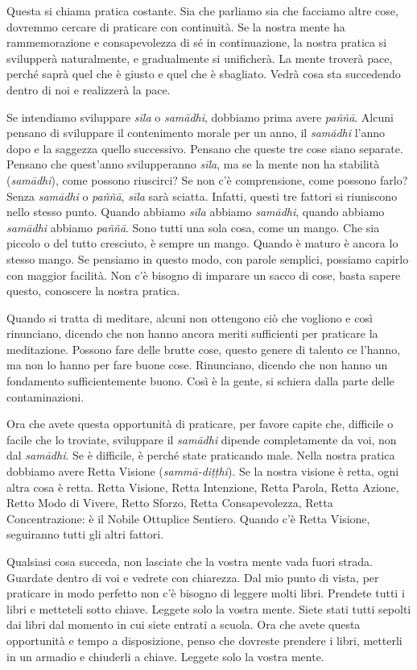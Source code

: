 Questa si chiama pratica costante. Sia che parliamo sia che facciamo
altre cose, dovremmo cercare di praticare con continuità. Se la nostra
mente ha rammemorazione e consapevolezza di sé in continuazione, la
nostra pratica si svilupperà naturalmente, e gradualmente si unificherà.
La mente troverà pace, perché saprà quel che è giusto e quel che è
sbagliato. Vedrà cosa sta succedendo dentro di noi e realizzerà la pace.

Se intendiamo sviluppare \emph{sīla} o \emph{samādhi}, dobbiamo prima
avere \emph{paññā}. Alcuni pensano di sviluppare il contenimento morale
per un anno, il \emph{samādhi} l'anno dopo e la saggezza quello
successivo. Pensano che queste tre cose siano separate. Pensano che
quest'anno svilupperanno \emph{sīla}, ma se la mente non ha stabilità
(\emph{samādhi}), come possono riuscirci? Se non c'è comprensione, come
possono farlo? Senza \emph{samādhi} o \emph{paññā}, \emph{sīla} sarà
sciatta. Infatti, questi tre fattori si riuniscono nello stesso punto.
Quando abbiamo \emph{sīla} abbiamo \emph{samādhi}, quando abbiamo
\emph{samādhi} abbiamo \emph{paññā}. Sono tutti una sola cosa, come un
mango. Che sia piccolo o del tutto cresciuto, è sempre un mango. Quando
è maturo è ancora lo stesso mango. Se pensiamo in questo modo, con
parole semplici, possiamo capirlo con maggior facilità. Non c'è bisogno
di imparare un sacco di cose, basta sapere questo, conoscere la nostra
pratica.

Quando si tratta di meditare, alcuni non ottengono ciò che vogliono e
così rinunciano, dicendo che non hanno ancora meriti sufficienti per
praticare la meditazione. Possono fare delle brutte cose, questo genere
di talento ce l'hanno, ma non lo hanno per fare buone cose. Rinunciano,
dicendo che non hanno un fondamento sufficientemente buono. Così è la
gente, si schiera dalla parte delle contaminazioni.

Ora che avete questa opportunità di praticare, per favore capite che,
difficile o facile che lo troviate, sviluppare il \emph{samādhi} dipende
completamente da voi, non dal \emph{samādhi}. Se è difficile, è perché
state praticando male. Nella nostra pratica dobbiamo avere Retta Visione
(\emph{sammā-diṭṭhi}). Se la nostra visione è retta, ogni altra cosa è
retta. Retta Visione, Retta Intenzione, Retta Parola, Retta Azione,
Retto Modo di Vivere, Retto Sforzo, Retta Consapevolezza, Retta
Concentrazione: è il Nobile Ottuplice Sentiero. Quando c'è Retta
Visione, seguiranno tutti gli altri fattori.

Qualsiasi cosa succeda, non lasciate che la vostra mente vada fuori
strada. Guardate dentro di voi e vedrete con chiarezza. Dal mio punto di
vista, per praticare in modo perfetto non c'è bisogno di leggere molti
libri. Prendete tutti i libri e metteteli sotto chiave. Leggete solo la
vostra mente. Siete stati tutti sepolti dai libri dal momento in cui
siete entrati a scuola. Ora che avete questa opportunità e tempo a
disposizione, penso che dovreste prendere i libri, metterli in un
armadio e chiuderli a chiave. Leggete solo la vostra mente.

